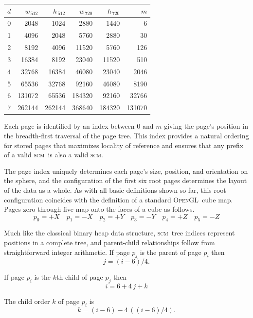 \documentclass[oneside,11pt]{memoir}
\newcommand{\opengl}  {\textsc{OpenGL}}
\newcommand{\scm}     {\textsc{scm}}
\newcommand{\B}{\bigstrut[b]}
\newcommand{\T}{\bigstrut[t]}
\begin{document}
\begin{Spacing}{1.1}
\begin{center}
\begin{tabular}{r|rr|rr|r}
$d$& $w_{\,512}$& $h_{\,512}$& $w_{\,720}$& $h_{\,720}$& $m$ \B\\\hline
\num{0}&  \num{2048}&  \num{1024}&  \num{2880}&  \num{1440}&     \num{6} \T\\
\num{1}&  \num{4096}&  \num{2048}&  \num{5760}&  \num{2880}&    \num{30} \\
\num{2}&  \num{8192}&  \num{4096}& \num{11520}&  \num{5760}&   \num{126} \\
\num{3}& \num{16384}&  \num{8192}& \num{23040}& \num{11520}&   \num{510} \\
\num{4}& \num{32768}& \num{16384}& \num{46080}& \num{23040}&  \num{2046} \\
\num{5}& \num{65536}& \num{32768}& \num{92160}& \num{46080}&  \num{8190} \\
\num{6}&\num{131072}& \num{65536}&\num{184320}& \num{92160}& \num{32766} \\
\num{7}&\num{262144}&\num{262144}&\num{368640}&\num{184320}&\num{131070} \\
\end{tabular}
\end{center}

Each page is identified by an index between $0$ and $m$ giving the page's position in the breadth-first traversal of the page tree. This index provides a natural ordering for stored pages that maximizes locality of reference and ensures that any prefix of a valid \scm\ is also a valid \scm.

The page index uniquely determines each page's size, position, and orientation on the sphere, and the configuration of the first six root pages determines the layout of the data as a whole. As with all basic definitions shown so far, this root configuration coincides with the definition of a standard \opengl\ cube map. Pages zero through five map onto the faces of a cube as follows.
\[p_0=+X\quad p_1=-X\quad p_2=+Y\quad p_3=-Y\quad p_4=+Z\quad p_5=-Z\]

Much like the classical binary heap data structure, \scm\ tree indices represent positions in a complete tree, and parent-child relationships follow from straightforward integer arithmetic. If page $p_j$ is the parent of page $p_i$ then
\[j=(i-6)/4.\]

If page $p_i$ is the $k$th child of page $p_j$ then
\[i=6+4\,j+k\]

The child order $k$ of page $p_i$ is
\[k=(i-6)-4\,((i-6)/4).\]


\end{Spacing}
\end{document}
